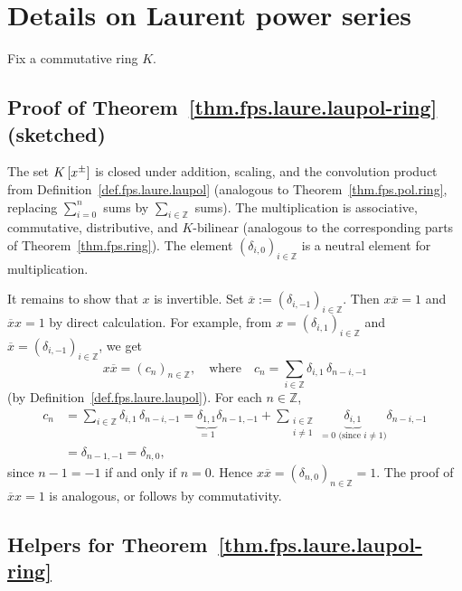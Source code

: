 \section{Details on Laurent power series}

Fix a commutative ring $K$.

\subsection{Proof of Theorem~\ref{thm.fps.laure.laupol-ring} (sketched)}

The set $K\left[x^{\pm}\right]$ is closed under addition, scaling, and
the convolution product from Definition~\ref{def.fps.laure.laupol}
(analogous to Theorem~\ref{thm.fps.pol.ring}, replacing
$\sum_{i=0}^{n}$ sums by $\sum_{i \in \mathbb{Z}}$ sums).
The multiplication is associative, commutative, distributive, and
$K$-bilinear (analogous to the corresponding parts of
Theorem~\ref{thm.fps.ring}). The element
$\left(\delta_{i,0}\right)_{i \in \mathbb{Z}}$ is a neutral element
for multiplication.

It remains to show that $x$ is invertible. Set
$\overline{x} := \left(\delta_{i,-1}\right)_{i \in \mathbb{Z}}$.
Then $x \overline{x} = 1$ and $\overline{x} x = 1$ by direct
calculation. For example, from
$x = \left(\delta_{i,1}\right)_{i \in \mathbb{Z}}$ and
$\overline{x} = \left(\delta_{i,-1}\right)_{i \in \mathbb{Z}}$, we
get
\[
  x \overline{x}
  = \left(c_n\right)_{n \in \mathbb{Z}},
  \quad \text{where} \quad
  c_n = \sum_{i \in \mathbb{Z}} \delta_{i,1}\,\delta_{n-i,-1}
\]
(by Definition~\ref{def.fps.laure.laupol}).
For each $n \in \mathbb{Z}$,
\begin{align*}
  c_n
  &= \sum_{i \in \mathbb{Z}} \delta_{i,1}\,\delta_{n-i,-1}
   = \underbrace{\delta_{1,1}}_{= 1} \delta_{n-1,-1}
     + \sum_{\substack{i \in \mathbb{Z} \\ i \neq 1}}
       \underbrace{\delta_{i,1}}_{= 0\text{ (since } i \neq 1\text{)}}
       \delta_{n-i,-1} \\
  &= \delta_{n-1,-1} = \delta_{n,0},
\end{align*}
since $n - 1 = -1$ if and only if $n = 0$. Hence
$x \overline{x} = \left(\delta_{n,0}\right)_{n \in \mathbb{Z}} = 1$.
The proof of $\overline{x} x = 1$ is analogous, or follows by commutativity.

\subsection{Helpers for Theorem~\ref{thm.fps.laure.laupol-ring}}

